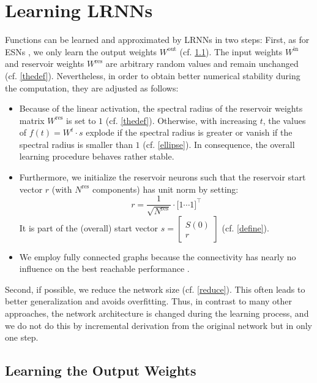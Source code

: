 \documentclass{sn-jnl}
\theoremstyle{definition}
\begin{document}
\section{Learning LRNNs}\label{learn}

Functions can be learned and approximated by LRNNs in two steps: First, as for
ESNs \citep{JH04}, we only learn the output weights $W^\mathrm{out}$ (cf.
\cref{output}). The input weights
$W^\mathrm{in}$ and reservoir weights $W^\mathrm{res}$ are arbitrary random
values and remain unchanged (cf. \cref{thedef}). Nevertheless, in order to
obtain better numerical stability during the computation, they are adjusted as
follows:
\begin{itemize}
  \item Because of the linear activation, the spectral radius of the reservoir
	weights matrix $W^\mathrm{res}$ is set to $1$ (cf. \cref{thedef}).
	Otherwise, with increasing $t$, the values of $f(t) = W^t \cdot s$
	explode if the spectral radius is greater or vanish if the spectral
	radius is smaller than $1$ (cf. \cref{ellipse}). In consequence, the
	overall learning procedure behaves rather stable.
  \item Furthermore, we initialize the reservoir neurons such that the reservoir
	start vector $r$ (with $N^\mathrm{res}$ components) has unit norm by setting:
	\[ r = \frac{1}{\sqrt{N^\mathrm{res}}} \cdot \big[ 1 \cdots 1 \big]^\top \]
	It is part of the (overall) start vector $s = \left[ \begin{array}{c}
	S(0) \\ r \end{array} \right]$ (cf. \cref{define}).
  \item We employ fully connected graphs because the
	connectivity has nearly no influence on the best reachable performance
	\citep{KLB12}.
\end{itemize}
Second, if possible, we reduce the network size (cf. \cref{reduce}). This often
leads to better generalization and avoids overfitting. Thus, in contrast to many
other approaches, the network architecture is changed during the learning
process, and we do not do this by incremental derivation from the original
network but in only one step.

\subsection{Learning the Output Weights}\label{output}
\end{document}
